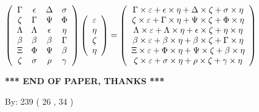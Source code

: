 \documentclass[12pt]{article}
\begin{document}
$  %
 \left( \begin{array}
 {
 c
 c
 c
 c
 }
 \Gamma & 
 \epsilon & 
 \Delta & 
 \sigma \\ 
                    \zeta & 
 \Gamma & 
 \Psi & 
 \Phi \\ 
 \Lambda & 
 \Lambda & 
 \epsilon & 
 \eta \\ 
 \beta & 
 \beta & 
 \beta & 
 \Gamma \\ 
                    \Xi & 
 \Phi & 
 \Psi & 
 \beta \\ 
                    \zeta & 
 \sigma & 
 \rho & 
 \gamma
 \end{array} \right)
 \left( \begin{array}
 {
 c
 }
 \varepsilon \\ 
 \eta \\ 
                    \zeta \\ 
 \eta
 \end{array} \right)
=
  \left( \begin{array}
 {
 c
 }
 \Gamma \times  \varepsilon   +  \epsilon \times  \eta   +  \Delta \times                     \zeta   +  \sigma \times  \eta \\ 
                    \zeta \times  \varepsilon   +  \Gamma \times  \eta   +  \Psi \times                     \zeta   +  \Phi \times  \eta \\ 
 \Lambda \times  \varepsilon   +  \Lambda \times  \eta   +  \epsilon \times                     \zeta   +  \eta \times  \eta \\ 
 \beta \times  \varepsilon   +  \beta \times  \eta   +  \beta \times                     \zeta   +  \Gamma \times  \eta \\ 
                    \Xi \times  \varepsilon   +  \Phi \times  \eta   +  \Psi \times                     \zeta   +  \beta \times  \eta \\ 
                    \zeta \times  \varepsilon   +  \sigma \times  \eta   +  \rho \times                     \zeta   +  \gamma \times  \eta
 \end{array} \right)
$
 
 
 
   
   
 \vspace{0.2in}
 
   
   
   
   
\vspace{1.0in} 
{\textbf{\large{ *** END OF PAPER, THANKS *** }}} 
   
   
\hspace{1.0in} By: 
 239 ( 26 ,  34 )
   
\end{document}
